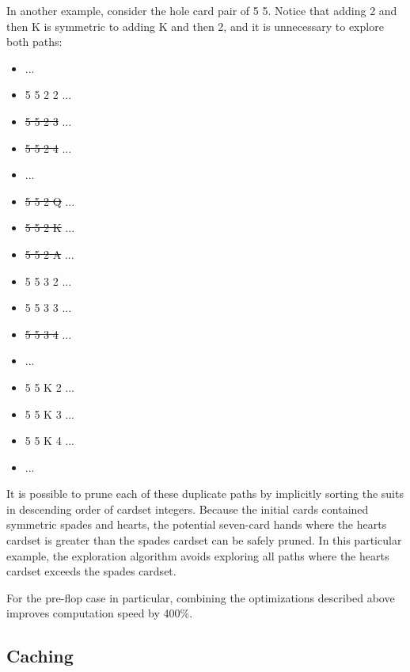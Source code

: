 In another example, consider the hole card pair of 5\xs{} 5\xh{}.
Notice that adding 2\xs{} and then K\xh{} is symmetric to adding K\xs{} and then 2\xh{}, and it is unnecessary to explore both paths:
\begin{itemize}
\singlespacing
\item ...
\item 5\xs{} 5\xh{} 2\xs{} 2\xh{} ...
\item \sout{5\xs{} 5\xh{} 2\xs{} 3\xh{}} ...
\item \sout{5\xs{} 5\xh{} 2\xs{} 4\xh{}} ...
\item ...
\item \sout{5\xs{} 5\xh{} 2\xs{} Q\xh{}} ...
\item \sout{5\xs{} 5\xh{} 2\xs{} K\xh{}} ...
\item \sout{5\xs{} 5\xh{} 2\xs{} A\xh{}} ...
\item 5\xs{} 5\xh{} 3\xs{} 2\xh{} ...
\item 5\xs{} 5\xh{} 3\xs{} 3\xh{} ...
\item \sout{5\xs{} 5\xh{} 3\xs{} 4\xh{}} ...
\item ...
\item 5\xs{} 5\xh{} K\xs{} 2\xh{} ...
\item 5\xs{} 5\xh{} K\xs{} 3\xh{} ...
\item 5\xs{} 5\xh{} K\xs{} 4\xh{} ...
\item ...
\end{itemize}
It is possible to prune each of these duplicate paths by implicitly sorting the suits in descending order of cardset integers.
Because the initial cards contained symmetric spades and hearts, the potential seven-card hands where the hearts cardset is greater than the spades cardset can be safely pruned.
In this particular example, the exploration algorithm avoids exploring all paths where the hearts cardset exceeds the spades cardset.


For the pre-flop case in particular, combining the optimizations described above improves computation speed by 400\%.

\subsection{Caching}
\label{sec:Caching}

